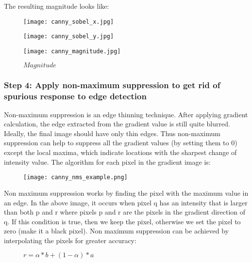 \vspace{5mm}
\noindent The resulting magnitude looks like:
\begin{figure}[!htb]
    \centering
    \begin{minipage}{.33\textwidth}
        \centering
        \texttt{[image: canny\_sobel\_x.jpg]}
        \caption{$Sobel_{x}$}
    \end{minipage}%
    \begin{minipage}{.33\textwidth}
        \centering
        \texttt{[image: canny\_sobel\_y.jpg]}
        \caption{$Sobel_{y}$}
    \end{minipage}
    \begin{minipage}{.33\textwidth}
        \centering
        \texttt{[image: canny\_magnitude.jpg]}
        \caption{$Magnitude$}
    \end{minipage}
\end{figure}


\subsubsection{Step 4: Apply non-maximum suppression to get rid of spurious response to edge detection}
Non-maximum suppression is an edge thinning technique. After applying gradient calculation, the edge extracted from the gradient value is still quite blurred. Ideally, the final image should have only thin edges. Thus non-maximum suppression can help to suppress all the gradient values (by setting them to 0) except the local maxima, which indicate locations with the sharpest change of intensity value. The algorithm for each pixel in the gradient image is:

\begin{figure}[!htb]
    \centering
    \texttt{[image: canny\_nms\_example.png]}
\end{figure}


\noindent Non maximum suppression works by finding the pixel with the maximum value in an edge. In the above image, it occurs when pixel q has an intensity that is larger than both p and r where pixels p and r are the pixels in the gradient direction of q. If this condition is true, then we keep the pixel, otherwise we set the pixel to zero (make it a black pixel). Non maximum suppression can be achieved by interpolating the pixels for greater accuracy:

\begin{figure}[!htb]
    \centering
    $r = \alpha * b + (1 − \alpha) * a$
\end{figure}

